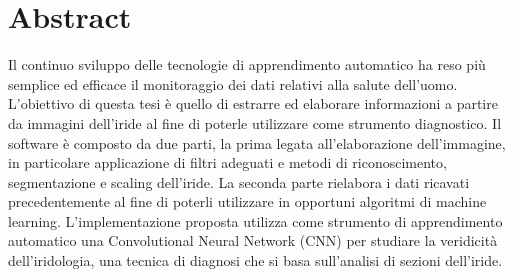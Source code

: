 \thispagestyle{plain}
\chapter*{Abstract}

Il continuo sviluppo delle tecnologie di apprendimento automatico ha reso più semplice ed efficace il monitoraggio dei dati relativi alla salute dell’uomo. L’obiettivo di questa tesi è quello di estrarre ed elaborare informazioni a partire da immagini dell’iride al fine di poterle utilizzare come strumento diagnostico. Il software è composto da due parti, la prima legata all’elaborazione dell’immagine, in particolare applicazione di filtri adeguati e metodi di riconoscimento, segmentazione e scaling dell’iride. La seconda parte rielabora i dati ricavati precedentemente al fine di poterli utilizzare in opportuni algoritmi di machine learning. L'implementazione proposta utilizza come strumento di apprendimento automatico una Convolutional Neural Network (CNN) per studiare la veridicità dell’iridologia, una tecnica di diagnosi che si basa sull’analisi di sezioni dell’iride.
